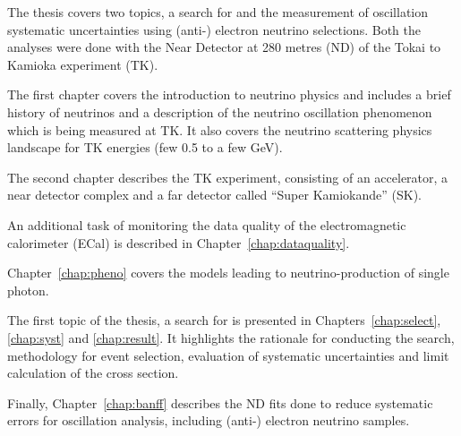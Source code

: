 The thesis covers two topics, a search for \nisp and the measurement
of oscillation systematic uncertainties using (anti-) electron
neutrino selections. Both the analyses were done with the Near
Detector at 280 metres (\Gls{ND}) of the Tokai to Kamioka experiment
(\Gls{TK}).

The first chapter covers the introduction to neutrino physics and
includes a brief history of neutrinos and a description of the
neutrino oscillation phenomenon which is being measured at
\Gls{TK}. It also covers the neutrino scattering physics landscape for
\Gls{TK} energies (few 0.5 to a few GeV).

The second chapter describes the \Gls{TK} experiment, consisting of an
accelerator, a near detector complex and a far detector called ``Super
Kamiokande'' (\Gls{SK}).

An additional task of monitoring the data quality of the
electromagnetic calorimeter (\Gls{ECal}) is described in
Chapter~\ref{chap:dataquality}.

Chapter~\ref{chap:pheno} covers the models leading to
neutrino-production of single photon.

The first topic of the thesis, a search for \nisp is presented in
Chapters~\ref{chap:select}, \ref{chap:syst} and \ref{chap:result}.  It
highlights the rationale for conducting the search, methodology for
event selection, evaluation of systematic uncertainties and limit
calculation of the cross section.

Finally, Chapter~\ref{chap:banff} describes the \Gls{ND} fits done to
reduce systematic errors for oscillation analysis, including (anti-)
electron neutrino samples.